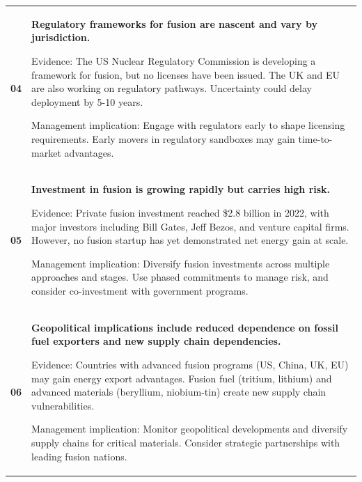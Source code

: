 \documentclass[10pt,a4paper]{article}
\begin{document}
\begin{tabularx}{\linewidth}{p{9mm}Y}
\textcolor{BOBlue}{\bfseries 04} & {\small\bfseries Regulatory frameworks for fusion are nascent and vary by jurisdiction.}\par{\scriptsize\color{BOMuted} Evidence: The US Nuclear Regulatory Commission is developing a framework for fusion, but no licenses have been issued. The UK and EU are also working on regulatory pathways. Uncertainty could delay deployment by 5-10 years.}\par{\scriptsize\color{BOMuted} Management implication: Engage with regulators early to shape licensing requirements. Early movers in regulatory sandboxes may gain time-to-market advantages.} \\[6pt]
\textcolor{BOBlue}{\bfseries 05} & {\small\bfseries Investment in fusion is growing rapidly but carries high risk.}\par{\scriptsize\color{BOMuted} Evidence: Private fusion investment reached \$2.8 billion in 2022, with major investors including Bill Gates, Jeff Bezos, and venture capital firms. However, no fusion startup has yet demonstrated net energy gain at scale.}\par{\scriptsize\color{BOMuted} Management implication: Diversify fusion investments across multiple approaches and stages. Use phased commitments to manage risk, and consider co-investment with government programs.} \\[6pt]
\textcolor{BOBlue}{\bfseries 06} & {\small\bfseries Geopolitical implications include reduced dependence on fossil fuel exporters and new supply chain dependencies.}\par{\scriptsize\color{BOMuted} Evidence: Countries with advanced fusion programs (US, China, UK, EU) may gain energy export advantages. Fusion fuel (tritium, lithium) and advanced materials (beryllium, niobium-tin) create new supply chain vulnerabilities.}\par{\scriptsize\color{BOMuted} Management implication: Monitor geopolitical developments and diversify supply chains for critical materials. Consider strategic partnerships with leading fusion nations.} \\[6pt]
\end{tabularx}
\end{document}
